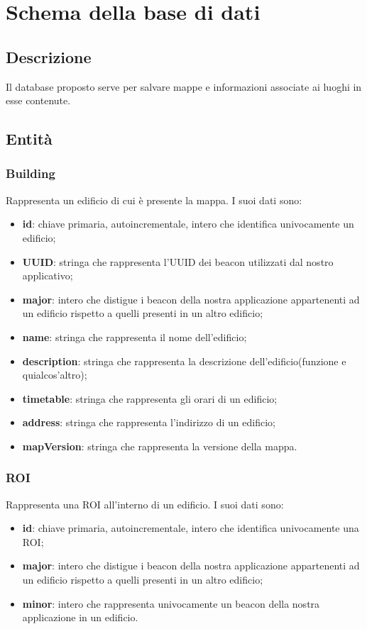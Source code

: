 \documentclass[../SpecificaTecnica.tex]{subfiles}
\begin{document}
\section{Schema della base di dati}
	\subsection{Descrizione}
		Il database proposto serve per salvare mappe e informazioni associate ai luoghi in esse contenute. 
	\subsection{Entità}
		\subsubsection{Building}
			Rappresenta un edificio di cui è presente la mappa. I suoi dati sono:
			\begin{itemize}
				\item \textbf{id}: chiave primaria, autoincrementale, intero che identifica univocamente un edificio;
				\item \textbf{UUID}: stringa che rappresenta l'UUID dei beacon utilizzati dal nostro applicativo;
				\item \textbf{major}: intero che distigue i beacon della nostra applicazione appartenenti ad un edificio rispetto a quelli presenti in un altro edificio;
				\item \textbf{name}: stringa che rappresenta il nome dell'edificio;
				\item \textbf{description}: stringa che rappresenta la descrizione dell'edificio(funzione e quialcos'altro);
				\item \textbf{timetable}: stringa che rappresenta gli orari di un edificio;
				\item \textbf{address}: stringa che rappresenta l'indirizzo di un edificio;
				\item \textbf{mapVersion}: stringa che rappresenta la versione della mappa.
			\end{itemize}
		\subsubsection{ROI}
			Rappresenta una ROI all'interno di un edificio. I suoi dati sono:
			\begin{itemize}
				\item \textbf{id}: chiave primaria, autoincrementale, intero che identifica univocamente una ROI;
				\item \textbf{major}: intero che distigue i beacon della nostra applicazione appartenenti ad un edificio rispetto a quelli presenti in un altro edificio;
				\item \textbf{minor}: intero che rappresenta univocamente un beacon della nostra applicazione in un edificio.
			\end{itemize}
\end{document}
